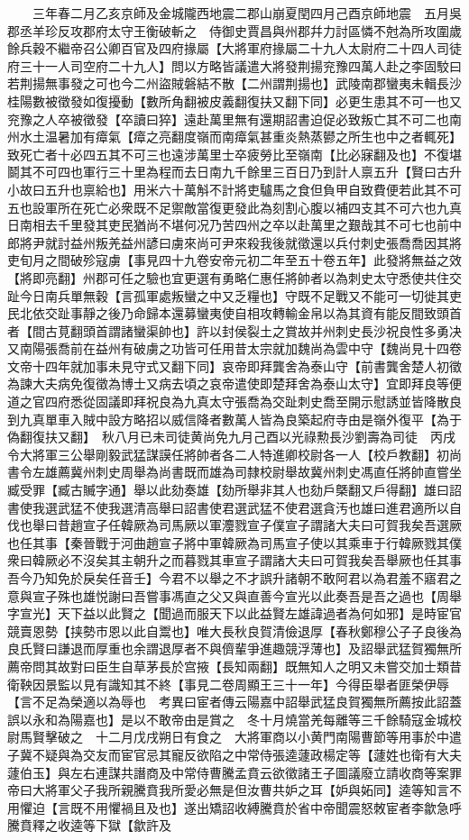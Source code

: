 　　三年春二月乙亥京師及金城隴西地震二郡山崩夏閏四月己酉京師地震　五月吳郡丞羊珍反攻郡府太守王衡破斬之　侍御史賈昌與州郡幷力討區憐不尅為所攻圍歲餘兵穀不繼帝召公卿百官及四府掾屬【大將軍府掾屬二十九人太尉府二十四人司徒府三十一人司空府二十九人】問以方略皆議遣大將發荆揚兖豫四萬人赴之李固駮曰若荆揚無事發之可也今二州盜賊磐結不散【二州謂荆揚也】武陵南郡蠻夷未輯長沙桂陽數被徵發如復擾動【數所角翻被皮義翻復扶又翻下同】必更生患其不可一也又兖豫之人卒被徵發【卒讀曰猝】遠赴萬里無有還期詔書迫促必致叛亡其不可二也南州水土温暑加有瘴氣【瘴之亮翻度嶺而南瘴氣甚重炎熱蒸鬰之所生也中之者輒死】致死亡者十必四五其不可三也遠涉萬里士卒疲勞比至嶺南【比必寐翻及也】不復堪鬬其不可四也軍行三十里為程而去日南九千餘里三百日乃到計人禀五升【賢曰古升小故曰五升也禀給也】用米六十萬斛不計將吏驢馬之食但負甲自致費便若此其不可五也設軍所在死亡必衆既不足禦敵當復更發此為刻割心腹以補四支其不可六也九真日南相去千里發其吏民猶尚不堪何况乃苦四州之卒以赴萬里之艱哉其不可七也前中郎將尹就討益州叛羌益州諺曰虜來尚可尹來殺我後就徵還以兵付刺史張喬喬因其將吏旬月之間破殄寇虜【事見四十九卷安帝元初二年至五十卷五年】此發將無益之效【將即亮翻】州郡可任之驗也宜更選有勇略仁惠任將帥者以為刺史太守悉使共住交趾今日南兵單無穀【言孤軍處叛蠻之中又乏糧也】守既不足戰又不能可一切徙其吏民北依交趾事靜之後乃命歸本還募蠻夷使自相攻轉輸金帛以為其資有能反間致頭首者【間古莧翻頭首謂諸蠻渠帥也】許以封侯裂土之賞故并州刺史長沙祝良性多勇决又南陽張喬前在益州有破虜之功皆可任用昔太宗就加魏尚為雲中守【魏尚見十四卷文帝十四年就加事未見守式又翻下同】哀帝即拜龔舍為泰山守【前書龔舍楚人初徵為諫大夫病免復徵為博士又病去頃之哀帝遣使即楚拜舍為泰山太守】宜即拜良等便道之官四府悉從固議即拜祝良為九真太守張喬為交趾刺史喬至開示慰誘並皆降散良到九真單車入賊中設方略招以威信降者數萬人皆為良築起府寺由是嶺外復平【為于偽翻復扶又翻】　秋八月已未司徒黄尚免九月己酉以光祿勲長沙劉壽為司徒　丙戌令大將軍三公舉剛毅武猛謀謨任將帥者各二人特進卿校尉各一人【校戶教翻】初尚書令左雄薦冀州刺史周舉為尚書既而雄為司隸校尉舉故冀州刺史馮直任將帥直嘗坐臧受罪【臧古贓字通】舉以此劾奏雄【劾所舉非其人也劾戶槩翻又戶得翻】雄曰詔書使我選武猛不使我選清高舉曰詔書使君選武猛不使君選貪汚也雄曰進君適所以自伐也舉曰昔趙宣子任韓厥為司馬厥以軍灋戮宣子僕宣子謂諸大夫曰可賀我矣吾選厥也任其事【秦晉戰于河曲趙宣子將中軍韓厥為司馬宣子使以其乘車于行韓厥戮其僕衆曰韓厥必不沒矣其主朝升之而暮戮其車宣子謂諸大夫曰可賀我矣吾舉厥也任其事吾今乃知免於戾矣任音壬】今君不以舉之不才誤升諸朝不敢阿君以為君羞不寤君之意與宣子殊也雄悦謝曰吾嘗事馮直之父又與直善今宣光以此奏吾是吾之過也【周舉字宣光】天下益以此賢之【聞過而服天下以此益賢左雄諱過者為何如邪】是時宦官競賣恩勢【挟勢市恩以此自鬻也】唯大長秋良賀清儉退厚【春秋鄭穆公子子良後為良氏賢曰謙退而厚重也余謂退厚者不與儕輩爭進趣競浮薄也】及詔舉武猛賀獨無所薦帝問其故對曰臣生自草茅長於宫掖【長知兩翻】既無知人之明又未嘗交加士類昔衛鞅因景監以見有識知其不終【事見二卷周顯王三十一年】今得臣舉者匪榮伊辱【言不足為榮適以為辱也　考異曰宦者傳云陽嘉中詔舉武猛良賀獨無所薦按此詔蓋誤以永和為陽嘉也】是以不敢帝由是賞之　冬十月燒當羌每離等三千餘騎寇金城校尉馬賢擊破之　十二月戊戌朔日有食之　大將軍商以小黄門南陽曹節等用事於中遣子冀不疑與為交友而宦官忌其寵反欲陷之中常侍張逵蘧政楊定等【蘧姓也衛有大夫蘧伯玉】與左右連謀共譖商及中常侍曹騰孟賁云欲徵諸王子圖議廢立請收商等案罪帝曰大將軍父子我所親騰賁我所愛必無是但汝曹共妒之耳【妒與妬同】逵等知言不用懼迫【言既不用懼禍且及也】遂出矯詔收縛騰賁於省中帝聞震怒敇宦者李歙急呼騰賁釋之收逵等下獄【歙許及